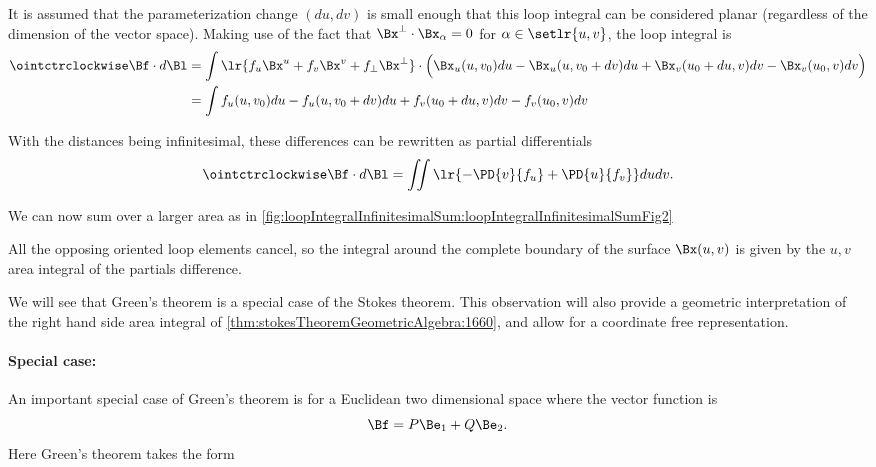 It is assumed that the parameterization change \((du, dv)\) is small enough that this loop integral can be considered planar (regardless of the dimension of the vector space).  Making use of the fact that \(\Bx^\perp \cdot \Bx_\alpha = 0\) for \(\alpha \in \setlr{u,v}\), the loop integral is
\begin{equation}\label{eqn:stokesTheoremGeometricAlgebra:1620}
\begin{aligned}
\ointctrclockwise \Bf \cdot d\Bl
&=
\int
\lr{
f_u \Bx^u + f_v \Bx^v + f_\perp \Bx^\perp
}
\cdot
\Bigl(
\Bx_u(u, v_0) du - \Bx_u(u, v_0 + dv) du
+\Bx_v(u_0 + du, v) dv - \Bx_v(u_0, v) dv
\Bigr) \\
&=
\int
f_u(u, v_0) du - f_u(u, v_0 + dv) du
+
f_v(u_0 + du, v) dv - f_v(u_0, v) dv
\end{aligned}
\end{equation}

With the distances being infinitesimal, these differences can be rewritten as partial differentials
\begin{equation}\label{eqn:stokesTheoremGeometricAlgebra:1860}
\ointctrclockwise \Bf \cdot d\Bl
=
\iint \lr{
-\PD{v}{f_u}
+\PD{u}{f_v}
}
du dv.
\end{equation}

We can now sum over a larger area as in \cref{fig:loopIntegralInfinitesimalSum:loopIntegralInfinitesimalSumFig2}


All the opposing oriented loop elements cancel, so the integral around the complete boundary of the surface \(\Bx(u, v)\) is given by the \(u,v\) area integral of the partials difference.

We will see that Green's theorem is a special case of the Stokes theorem.  This observation will also provide a geometric interpretation of the right hand side area integral of \cref{thm:stokesTheoremGeometricAlgebra:1660}, and allow for a coordinate free representation.

\paragraph{Special case:}
An important special case of Green's theorem is for a Euclidean two dimensional space where the vector function is
\begin{equation}\label{eqn:stokesTheoremGeometricAlgebra:1720}
\Bf = P \Be_1 + Q \Be_2.
\end{equation}
Here Green's theorem takes the form
